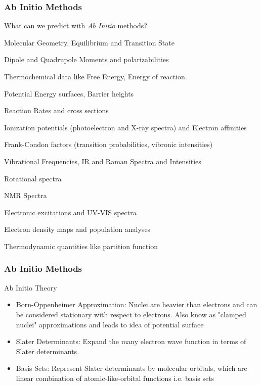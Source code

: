 \documentclass[slidestop,mathserif,compress,xcolor=svgnames]{beamer}
\begin{document}
\begin{frame}
\frametitle{\small Ab Initio Methods}
\footnotesize{
\vspace{-0.5cm}
\begin{block}{What can we predict with \emph{Ab Initio} methods?}
\begin{itemize}
\footnotesize{
 \item Molecular Geometry, Equilibrium and Transition State
 \item Dipole and Quadrupole Moments and polarizabilities
 \item Thermochemical data like Free Energy, Energy of reaction.
 \item Potential Energy surfaces, Barrier heights
 \item Reaction Rates and cross sections
 \item Ionization potentials (photoelectron and X-ray spectra) and Electron affinities
 \item Frank-Condon factors (transition probabilities, vibronic intensities)
 \item Vibrational Frequencies, IR and Raman Spectra and Intensities
 \item Rotational spectra
 \item NMR Spectra
 \item Electronic excitations and UV-VIS spectra
 \item Electron density maps and population analyses
 \item Thermodynamic quantities like partition function
}
\end{itemize}
\end{block}
}
\end{frame}
\begin{frame}
\frametitle{\small Ab Initio Methods}
\footnotesize{
\begin{block}{Ab Initio Theory}
\begin{itemize}
\item {\color{blue}Born-Oppenheimer Approximation}: Nuclei are heavier than electrons and can be considered stationary with respect to electrons. Also know as "clamped nuclei" approximations and leads to idea of potential surface
\item {\color{blue}Slater Determinants}: Expand the many electron wave function in terms of Slater determinants.
\item {\color{blue}Basis Sets}: Represent Slater determinants by molecular orbitals, which are linear combination of atomic-like-orbital functions i.e. basis sets
\end{itemize}
\end{block}
}
\end{frame}
\end{document}
